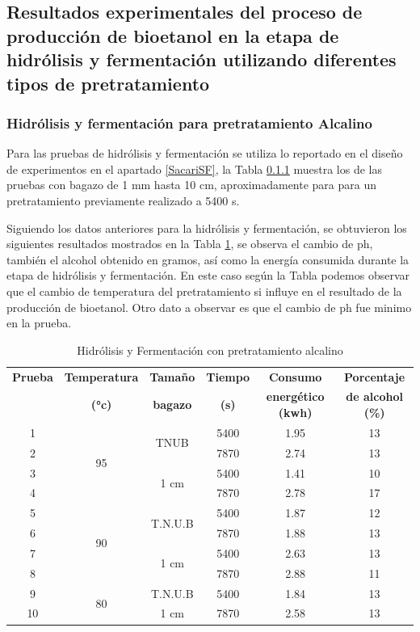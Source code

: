 \documentclass[12pt]{article}
\begin{document}
	\subsection{Resultados experimentales del proceso de producción de bioetanol en la etapa de hidrólisis y fermentación utilizando diferentes tipos de pretratamiento}
	\subsubsection{ Hidrólisis y fermentación para pretratamiento Alcalino}
	
	Para las pruebas de hidrólisis y fermentación se utiliza lo reportado en el diseño de experimentos en el apartado \ref{SacariSF}, la Tabla \ref{} muestra los de las pruebas con bagazo de 1 mm hasta 10 cm, aproximadamente para para un pretratamiento previamente realizado a 5400 s.
	
	
	Siguiendo los datos anteriores para la hidrólisis y fermentación, se obtuvieron los siguientes resultados mostrados en la Tabla \ref{ssf con Pretratamiento Alcalino}, se observa el cambio de ph, también el alcohol obtenido en gramos, así como la energía consumida durante la etapa de hidrólisis y fermentación. En este caso según la Tabla podemos observar que el cambio de temperatura del pretratamiento si influye en el resultado de la producción de bioetanol. Otro dato a observar es que el cambio de ph fue minimo en la prueba.
	
	
	\begin{table}[H]
		\centering
		\caption{Hidrólisis y Fermentación con pretratamiento alcalino}
		\begin{tabular}{|c|c|c|c|c|c|}
			\hline
			\textbf{Prueba} & \textbf{Temperatura} & \textbf{Tamaño} & \textbf{Tiempo} & \textbf{Consumo } & \textbf{Porcentaje} \\
				&\textbf{ (°c)}& \textbf{bagazo}&\textbf{(s)}	&\textbf{ energético (kwh)}&\textbf{ de alcohol (\%)}\\ \hline
			1 & \multirow{4}{*}{95} & \multirow{2}{*}{TNUB} & 5400 & 1.95 & 13 \\ \cline{1-1} \cline{4-6}
			2 &  &  & 7870 & 2.74 & 13 \\ \cline{3-6}  \cline{1-1}
			3 &  &\multirow{2}{*}{1 cm} & 5400 & 1.41 & 10 \\ \cline{4-6}  \cline{1-1}
			4 & &  & 7870 & 2.78 & 17 \\ \hline
			5 & \multirow{4}{*}{90} & \multirow{2}{*}{T.N.U.B} & 5400 & 1.87 & 12 \\  \cline{1-1} \cline{4-6}
			6 &  &  & 7870 & 1.88 & 13 \\ \cline{1-1} \cline{3-6}
			7 &  & \multirow{2}{*}{1 cm} & 5400 & 2.63 & 13 \\ \cline{1-1} \cline{4-6}
			8 &  &  & 7870 & 2.88 & 11 \\ \hline
			9 &\multirow{2}{*}{80 } & T.N.U.B & 5400 & 1.84 & 13 \\ \cline{1-1} \cline{3-6}
			10 & & 1 cm & 7870 & 2.58 & 13 \\ \hline
		\end{tabular}
		\label{ssf con Pretratamiento Alcalino}
	\end{table}
	
\end{document}
